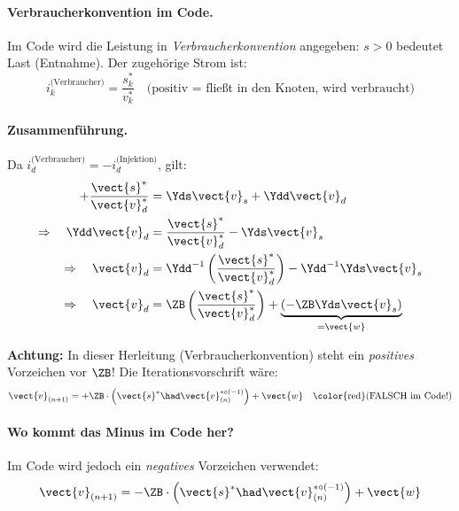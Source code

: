 \paragraph{Verbraucherkonvention im Code.}
Im Code wird die Leistung in \textit{Verbraucherkonvention} angegeben: $s > 0$ bedeutet Last (Entnahme). Der zugehörige Strom ist:
\begin{equation}
	i_k^{\text{(Verbraucher)}} = \frac{s_k^*}{v_k^*} \quad \text{(positiv = fließt in den Knoten, wird verbraucht)}
	\label{eq:vorzeichen_2}
\end{equation}

\paragraph{Zusammenführung.}
Da $i_d^{\text{(Verbraucher)}} = -i_d^{\text{(Injektion)}}$, gilt:
\begin{align}
	+\frac{\vect{s}^*}{\vect{v}_d^*} &= \Yds \vect{v}_s + \Ydd \vect{v}_d \label{eq:vorzeichen_3}\\
	\Rightarrow\quad \Ydd \vect{v}_d &= \frac{\vect{s}^*}{\vect{v}_d^*} - \Yds \vect{v}_s \label{eq:vorzeichen_4}\\
	\Rightarrow\quad \vect{v}_d &= \Ydd^{-1}\left(\frac{\vect{s}^*}{\vect{v}_d^*}\right) - \Ydd^{-1} \Yds \vect{v}_s \label{eq:vorzeichen_5}\\
	\Rightarrow\quad \vect{v}_d &= \ZB \left(\frac{\vect{s}^*}{\vect{v}_d^*}\right) + \underbrace{(-\ZB \Yds \vect{v}_s)}_{= \vect{w}} \label{eq:vorzeichen_6}
\end{align}

\textbf{Achtung:} In dieser Herleitung (Verbraucherkonvention) steht ein \textit{positives} Vorzeichen vor $\ZB$! Die Iterationsvorschrift wäre:
\begin{equation}
	\vect{v}_{(n+1)} = +\ZB \cdot \left(\vect{s}^* \had \vect{v}_{(n)}^{*\circ(-1)}\right) + \vect{w} \quad \text{\color{red}(FALSCH im Code!)}
	\label{eq:vorzeichen_falsch}
\end{equation}

\paragraph{Wo kommt das Minus im Code her?}
Im Code wird jedoch ein \textit{negatives} Vorzeichen verwendet:
\begin{equation}
	\vect{v}_{(n+1)} = \mathbf{-}\ZB \cdot \left(\vect{s}^* \had \vect{v}_{(n)}^{*\circ(-1)}\right) + \vect{w}
	\label{eq:vorzeichen_code}
\end{equation}

